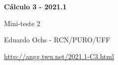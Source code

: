 \documentclass[oneside,12pt]{article}
\begin{document}


%
%

\def\drafturl{http://angg.twu.net/LATEX/2021-1-C3.pdf}
\def\drafturl{http://angg.twu.net/2021.1-C3.html}
\def\draftfooter{\tiny \href{\drafturl}{\jobname{}} \ColorBrown{\shorttoday{} \hours}}



%

\thispagestyle{empty}

\begin{center}

\vspace*{1.2cm}

{\bf \Large Cálculo 3 - 2021.1}

\bsk

Mini-teste 2

\bsk

Eduardo Ochs - RCN/PURO/UFF

\url{http://angg.twu.net/2021.1-C3.html}

\end{center}

\newpage
\end{document}
